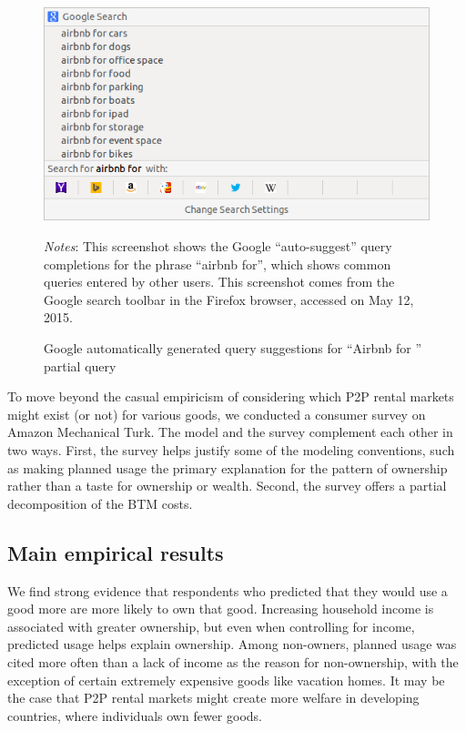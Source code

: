 \documentclass[11pt]{article}
\begin{document}
\begin{figure}
\centering 
\caption{Google automatically generated query suggestions for ``Airbnb for '' partial query}
\label{fig:auto} 
\begin{minipage}{0.70 \linewidth}
  \includegraphics[width = \linewidth]{./images/airbnb_for_x.png} \\
  \begin{footnotesize}
  \emph{Notes}: This screenshot shows the Google ``auto-suggest'' query completions for the phrase ``airbnb for'', which shows common queries entered by other users.
  This screenshot comes from the Google search toolbar in the Firefox browser, accessed on May 12, 2015.
  \end{footnotesize}
\end{minipage}
\end{figure} 

To move beyond the casual empiricism of considering which P2P rental markets might exist (or not) for various goods, we conducted a consumer survey on Amazon Mechanical Turk. 
The model and the survey complement each other in two ways. 
First, the survey helps justify some of the modeling conventions, such as making planned usage the primary explanation for the pattern of ownership rather than a taste for ownership or wealth. 
Second, the survey offers a partial decomposition of the BTM costs. 

\subsection{Main empirical results}
We find strong evidence that respondents who predicted that they would use a good more are more likely to own that good.
Increasing household income is associated with greater ownership, but even when controlling for income, predicted usage helps explain ownership. 
Among non-owners, planned usage was cited more often than a lack of income as the reason for non-ownership, with the exception of certain extremely expensive goods like vacation homes.
It may be the case that P2P rental markets might create more welfare in developing countries, where individuals own fewer goods. 
\end{document}
